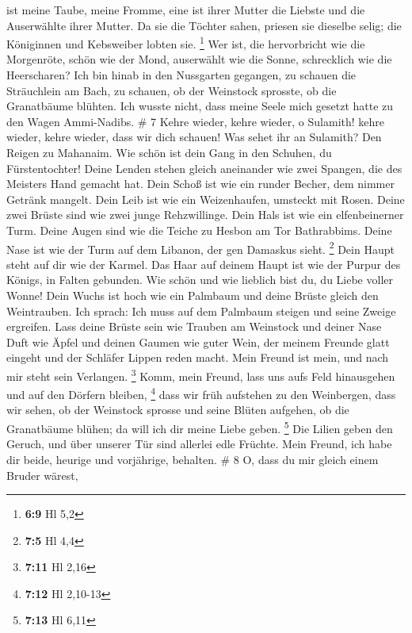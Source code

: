 ist meine Taube, meine Fromme, eine ist ihrer Mutter die Liebste und die
Auserwählte ihrer Mutter. Da sie die Töchter sahen, priesen sie dieselbe
selig; die Königinnen und Kebsweiber lobten sie. \footnote{\textbf{6:9}
  Hl 5,2}  Wer ist, die hervorbricht wie die Morgenröte,
schön wie der Mond, auserwählt wie die Sonne, schrecklich wie die
Heerscharen?  Ich bin hinab in den Nussgarten gegangen,
zu schauen die Sträuchlein am Bach, zu schauen, ob der Weinstock
sprosste, ob die Granatbäume blühten.  Ich wusste nicht,
dass meine Seele mich gesetzt hatte zu den Wagen Ammi-Nadibs. \# 7
 Kehre wieder, kehre wieder, o Sulamith! kehre wieder,
kehre wieder, dass wir dich schauen! Was sehet ihr an Sulamith? Den
Reigen zu Mahanaim.  Wie schön ist dein Gang in den
Schuhen, du Fürstentochter! Deine Lenden stehen gleich aneinander wie
zwei Spangen, die des Meisters Hand gemacht hat.  Dein
Schoß ist wie ein runder Becher, dem nimmer Getränk mangelt. Dein Leib
ist wie ein Weizenhaufen, umsteckt mit Rosen.  Deine zwei
Brüste sind wie zwei junge Rehzwillinge.  Dein Hals ist
wie ein elfenbeinerner Turm. Deine Augen sind wie die Teiche zu Hesbon
am Tor Bathrabbims. Deine Nase ist wie der Turm auf dem Libanon, der gen
Damaskus sieht. \footnote{\textbf{7:5} Hl 4,4}  Dein Haupt
steht auf dir wie der Karmel. Das Haar auf deinem Haupt ist wie der
Purpur des Königs, in Falten gebunden.  Wie schön und wie
lieblich bist du, du Liebe voller Wonne!  Dein Wuchs ist
hoch wie ein Palmbaum und deine Brüste gleich den Weintrauben.
 Ich sprach: Ich muss auf dem Palmbaum steigen und seine
Zweige ergreifen. Lass deine Brüste sein wie Trauben am Weinstock und
deiner Nase Duft wie Äpfel  und deinen Gaumen wie guter
Wein, der meinem Freunde glatt eingeht und der Schläfer Lippen reden
macht.  Mein Freund ist mein, und nach mir steht sein
Verlangen. \footnote{\textbf{7:11} Hl 2,16}  Komm, mein
Freund, lass uns aufs Feld hinausgehen und auf den Dörfern bleiben,
\footnote{\textbf{7:12} Hl 2,10-13}  dass wir früh
aufstehen zu den Weinbergen, dass wir sehen, ob der Weinstock sprosse
und seine Blüten aufgehen, ob die Granatbäume blühen; da will ich dir
meine Liebe geben. \footnote{\textbf{7:13} Hl 6,11}  Die
Lilien geben den Geruch, und über unserer Tür sind allerlei edle
Früchte. Mein Freund, ich habe dir beide, heurige und vorjährige,
behalten. \# 8  O, dass du mir gleich einem Bruder wärest,
